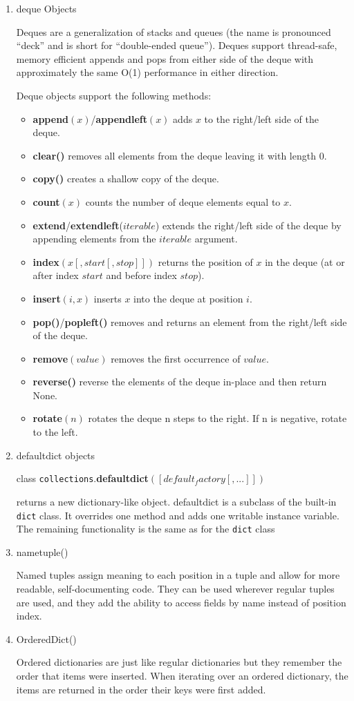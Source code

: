 \begin{enumerate}
\item deque Objects

Deques are a generalization of stacks and queues (the name is pronounced “deck” and is short for “double-ended queue”). Deques support thread-safe, memory efficient appends and pops from either side of the deque with approximately the same O(1) performance in either direction.

Deque objects support the following methods:
\begin{itemize}
\item \textbf{append}$(x)$/\textbf{appendleft}$(x)$ adds $x$ to the right/left side of the deque.
\item \textbf{clear()} removes all elements from the deque leaving it with length 0.
\item \textbf{copy()} creates a shallow copy of the deque.
\item \textbf{count}$(x)$ counts the number of deque elements equal to $x$.
\item \textbf{extend}/\textbf{extendleft}($iterable$) extends the right/left side of the deque by appending elements from the $iterable$ argument.
\item \textbf{index}$(x[, start[, stop]])$ returns the position of $x$ in the deque (at or after index $start$ and before index $stop$).
\item \textbf{insert}$(i, x)$ inserts $x$ into the deque at position $i$.
\item \textbf{pop()}/\textbf{popleft()} removes and returns an element from the right/left side of the deque.
\item \textbf{remove}$(value)$ removes the first occurrence of $value$.
\item \textbf{reverse()} reverse the elements of the deque in-place and then return None.
\item \textbf{rotate}$(n)$ rotates the deque n steps to the right. If n is negative, rotate to the left.
\end{itemize}

\item defaultdict objects

class \texttt{collections}.\textbf{defaultdict}$([default_factory[, ...]])$

returns a new dictionary-like object. defaultdict is a subclass of the built-in \texttt{dict} class. It overrides one method and adds one writable instance variable. The remaining functionality is the same as for the \texttt{dict} class

\item nametuple()

Named tuples assign meaning to each position in a tuple and allow for more readable, self-documenting code. They can be used wherever regular tuples are used, and they add the ability to access fields by name instead of position index.

\item OrderedDict()

Ordered dictionaries are just like regular dictionaries but they remember the order that items were inserted. When iterating over an ordered dictionary, the items are returned in the order their keys were first added.
\end{enumerate}